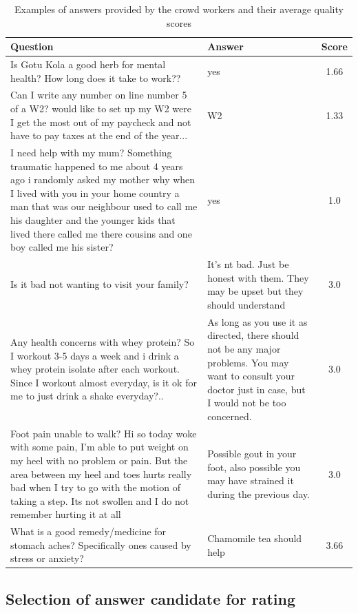 \documentclass[letterpaper]{article}
\begin{document}
\begin{table}[ht]
\centering
\begin{tabular}{| p{10cm} | p{5.5cm} | c |}
\hline
Question & Answer & Score \\
\hline
 Is Gotu Kola a good herb for mental health? How long does it take to work?? & yes & 1.66\\
 \hline
Can I write any number on line number 5 of a W2?  would like to set up my W2 were I get the most out of my paycheck and not have to pay taxes at the end of the year... & W2 & 1.33\\
 \hline
I need help with my mum? Something traumatic happened to me about 4 years ago i randomly asked my mother why when I lived with you in your home country a man that was our neighbour used to call me his daughter and the younger kids that lived there called me there cousins and one boy called me his sister? & yes & 1.0\\
\hline
\hline
 Is it bad not wanting to visit your family? & It's nt bad. Just be honest with them. They may be upset but they should understand & 3.0 \\
 \hline
Any health concerns with whey protein? So I workout 3-5 days a week and i drink a whey protein isolate after each workout. Since I workout almost everyday, is it ok for me to just drink a shake everyday?.. & As long as you use it as directed, there should not be any major problems.  You may want to consult your doctor just in case, but I would not be too concerned. & 3.0\\
\hline
Foot pain unable to walk? Hi so today woke with some pain, I'm able to put weight on my heel with no problem or pain.  But  the area between my heel and toes hurts really bad when I try to go with the motion of taking a step. Its not swollen and I do not remember hurting it at all & Possible gout in your foot, also possible you may have strained it during the previous day. & 3.0\\
\hline
What is a good remedy/medicine for stomach aches? Specifically ones caused by stress or anxiety? & Chamomile tea should help & 3.66\\
\hline
\end{tabular}
\caption{Examples of answers provided by the crowd workers and their average quality scores}
\label{table:answer_examples}
\end{table}

\subsection{Selection of answer candidate for rating}
\label{sec:analysis:order}
\end{document}
